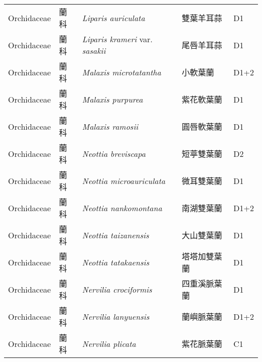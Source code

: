 {\begin{longtable}{p{2.5cm}p{2.5cm}p{4.5cm}p{2.5cm}p{3cm}}
    Orchidaceae & 蘭科 & \textit{Liparis auriculata}  & 雙葉羊耳蒜 & D1 \index{Liparis@\textit{Liparis}!auriculata@\textit{auriculata}}  \index{雙葉羊耳蒜} \\
    Orchidaceae & 蘭科 & \textit{Liparis krameri} var. \textit{sasakii}  & 尾唇羊耳蒜 & D1 \index{Liparis@\textit{Liparis}!krameri@\textit{krameri}!var. sasakii@var. \textit{sasakii}}  \index{尾唇羊耳蒜} \\
    Orchidaceae & 蘭科 & \textit{Malaxis microtatantha}  & 小軟葉蘭 & D1+2 \index{Malaxis@\textit{Malaxis}!microtatantha@\textit{microtatantha}}  \index{小軟葉蘭} \\
    Orchidaceae & 蘭科 & \textit{Malaxis purpurea}  & 紫花軟葉蘭 & D1 \index{Malaxis@\textit{Malaxis}!purpurea@\textit{purpurea}}  \index{紫花軟葉蘭} \\
    Orchidaceae & 蘭科 & \textit{Malaxis ramosii}  & 圓唇軟葉蘭 & D1 \index{Malaxis@\textit{Malaxis}!ramosii@\textit{ramosii}}  \index{圓唇軟葉蘭} \\
    Orchidaceae & 蘭科 & \textit{Neottia breviscapa}  & 短葶雙葉蘭 & D2 \index{Neottia@\textit{Neottia}!breviscapa@\textit{breviscapa}}  \index{短葶雙葉蘭} \\
    Orchidaceae & 蘭科 & \textit{Neottia microauriculata}  & 微耳雙葉蘭 & D1 \index{Neottia@\textit{Neottia}!microauriculata@\textit{microauriculata}}  \index{微耳雙葉蘭} \\
    Orchidaceae & 蘭科 & \textit{Neottia nankomontana}  & 南湖雙葉蘭 & D1+2 \index{Neottia@\textit{Neottia}!nankomontana@\textit{nankomontana}}  \index{南湖雙葉蘭} \\
    Orchidaceae & 蘭科 & \textit{Neottia taizanensis}  & 大山雙葉蘭 & D1 \index{Neottia@\textit{Neottia}!taizanensis@\textit{taizanensis}}  \index{大山雙葉蘭} \\
    Orchidaceae & 蘭科 & \textit{Neottia tatakaensis}  & 塔塔加雙葉蘭 & D1 \index{Neottia@\textit{Neottia}!tatakaensis@\textit{tatakaensis}}  \index{塔塔加雙葉蘭} \\
    Orchidaceae & 蘭科 & \textit{Nervilia crociformis}  & 四重溪脈葉蘭 & D1 \index{Nervilia@\textit{Nervilia}!crociformis@\textit{crociformis}}  \index{四重溪脈葉蘭} \\
    Orchidaceae & 蘭科 & \textit{Nervilia lanyuensis}  & 蘭嶼脈葉蘭 & D1+2 \index{Nervilia@\textit{Nervilia}!lanyuensis@\textit{lanyuensis}}  \index{蘭嶼脈葉蘭} \\
    Orchidaceae & 蘭科 & \textit{Nervilia plicata}  & 紫花脈葉蘭 & C1 \index{Nervilia@\textit{Nervilia}!plicata@\textit{plicata}}  \index{紫花脈葉蘭} \\

\end{longtable}}
